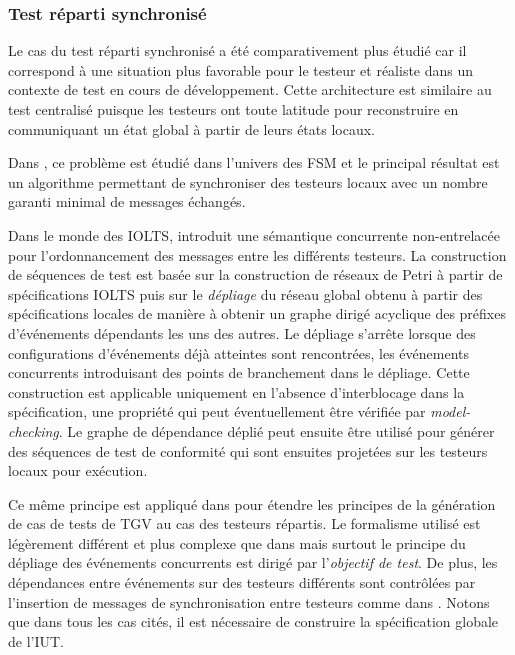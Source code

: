 \subsubsection{Test r\'eparti synchronis\'e}

Le cas du test r\'eparti synchronis\'e a \'et\'e comparativement
plus \'etudi\'e car il correspond \`a une situation plus favorable
pour le testeur et  r\'ealiste dans un contexte de test en cours
de d\'eveloppement. Cette architecture est similaire au test
centralis\'e puisque les testeurs  
ont toute latitude pour reconstruire en communiquant un \'etat global
\`a partir de leurs \'etats locaux.

Dans \cite{cacciari-dist-test}, ce probl\`eme est \'etudi\'e dans
l'univers des \textsf{FSM} et le principal r\'esultat est un algorithme
permettant de synchroniser des testeurs locaux avec un nombre garanti
minimal de messages \'echang\'es.

Dans le monde des \textsf{IOLTS},
\cite{ulrich-concur-testing} introduit une
s\'emantique concurrente non-entrelac\'ee pour l'ordonnancement
des messages entre les diff\'erents testeurs. La construction de
s\'equences de test est
bas\'ee sur la construction de r\'eseaux de Petri \`a partir de
sp\'ecifications \textsf{IOLTS} puis sur le \emph{d\'epliage} du r\'eseau global
obtenu \`a partir des sp\'ecifications locales de mani\`ere \`a
obtenir un graphe dirig\'e acyclique des pr\'efixes
d'\'ev\'enements d\'ependants les uns des autres. Le d\'epliage
s'arr\^ete lorsque des configurations d'\'ev\'enements d\'ej\`a
atteintes sont rencontr\'ees, les \'ev\'enements concurrents
introduisant des points de branchement dans le d\'epliage. Cette
construction est applicable uniquement en l'absence d'interblocage
 dans la sp\'ecification, une propri\'et\'e qui peut
\'eventuellement \^etre v\'erifi\'ee par
\emph{model-checking}. Le graphe de d\'ependance d\'epli\'e peut
ensuite \^etre utilis\'e pour g\'en\'erer des s\'equences de
test de conformit\'e qui sont ensuites projet\'ees sur les testeurs
locaux pour ex\'ecution. 

Ce m\^eme principe est appliqu\'e dans \cite{jard-synth-dist-test}
pour \'etendre les principes de la g\'en\'eration de cas de tests
de \textsf{TGV} au cas des testeurs r\'epartis. Le formalisme utilis\'e est
l\'eg\`erement diff\'erent et plus complexe que dans \cite{ulrich-concur-testing} mais
surtout le principe du d\'epliage des \'ev\'enements concurrents
est dirig\'e par l'\emph{objectif de test}. De plus, les
d\'ependances entre \'ev\'enements sur des testeurs diff\'erents
sont contr\^ol\'ees par l'insertion de messages de synchronisation
entre testeurs comme dans \cite{cacciari-dist-test}. Notons que dans
tous les cas cit\'es, il est n\'ecessaire de construire la
sp\'ecification globale de l'IUT.

